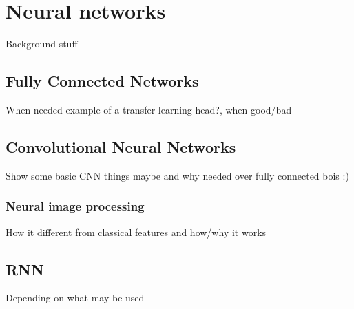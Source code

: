 \chapter{Neural networks}
Background stuff 
\section{Fully Connected Networks}
When needed example of a transfer learning head?, when good/bad
\section{Convolutional Neural Networks}
Show some basic CNN things maybe and why needed over fully connected bois :) 
\subsection{Neural image processing}
How it different from classical features and how/why it works
\section{RNN}
Depending on what may be used